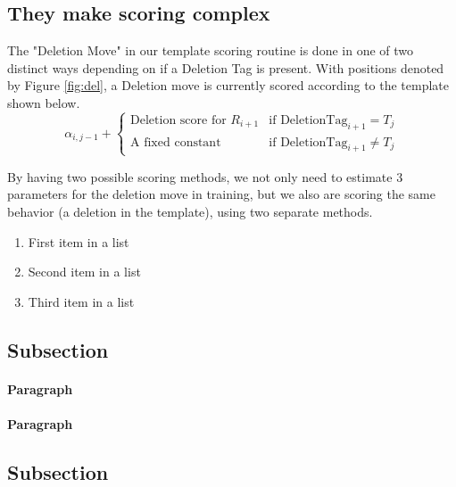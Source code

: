 \documentclass[fleqn,10pt]{SelfArx} %
\begin{document}
\subsection{They make scoring complex}

The "Deletion Move" in our template scoring routine is done in one of two distinct ways depending on if a Deletion Tag is present.  With positions denoted by Figure \ref{fig:del}, a Deletion move is currently scored according to the template shown below.  
\[
	\alpha_{i,j-1}  +  \begin{cases}
							 \text{Deletion score  for } R_{i+1}  & \text{if }  \text{DeletionTag}_{i+1} = T_{j} \\
							 \text{A fixed constant} & \text{if }  \text{DeletionTag}_{i+1} \neq T_{j} 
							 \end{cases}
\]

By having two possible scoring methods, we not only need to estimate 3 parameters for the deletion move in training, but we also are scoring the same behavior (a deletion in the template), using two separate methods.


\lipsum[5] %

\begin{enumerate}[noitemsep] %
\item First item in a list
\item Second item in a list
\item Third item in a list
\end{enumerate}

\subsection{Subsection}

\lipsum[6] %

\paragraph{Paragraph} \lipsum[7] %
\paragraph{Paragraph} \lipsum[8] %

\subsection{Subsection}
\end{document}

